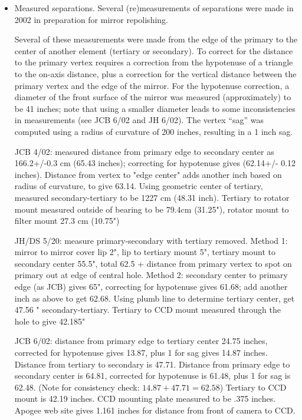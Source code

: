 \documentclass{article}[12pt]
\begin{document}
\begin{itemize}
\item Measured separations. Several (re)measurements of separations were
made in 2002 in preparation for mirror repolishing. 

Several of these measurements were made from the edge of the primary
to the center of another element (tertiary or secondary). To correct for
the distance to the primary vertex requires a correction from the hypotenuse
of a triangle to the on-axis distance, plus a correction for the vertical
distance between the primary vertex and the edge of the mirror. For
the hypotenuse correction, a diameter of the front surface of the mirror
was measured (approximately) to be 41 inches; note that using a smaller
diameter leads to some inconsistencies in measurements (see JCB 6/02 and
JH 6/02). The vertex ``sag'' was computed using a radius of curvature
of 200 inches, resulting in a 1 inch sag.

JCB 4/02: measured distance
from primary edge to secondary center as 166.2+/-0.3 cm (65.43 inches); 
correcting for hypotenuse gives (62.14+/- 0.12 inches). Distance from
vertex to "edge center" adds another inch based on radius of curvature,
to give 63.14. Using geometric center of tertiary, measured secondary-tertiary
to be 1227 cm (48.31 inch). Tertiary to rotator mount measured outside
of bearing to be 79.4cm (31.25"), rotator mount to filter mount 27.3 cm
(10.75")

JH/DS 5/20: measure primary-secondary with tertiary removed. Method 1:
mirror to mirror cover lip 2", lip to tertiary mount 5", tertiary mount
to secondary center 55.5", total 62.5 + distance from primary vertex to
spot on primary out at edge of central hole. Method 2: secondary center
to primary edge (as JCB) gives 65", correcting for hypotenuse gives 61.68;
add another inch as above to get 62.68. Using plumb line to determine tertiary
center, get 47.56 " secondary-tertiary. Tertiary to CCD mount measured
through the hole to give 42.185"

JCB 6/02: distance from primary edge to tertiary center 24.75 inches,
corrected for hypotenuse gives 13.87, plus 1 for sag gives 14.87 inches.
Distance from tertiary to secondary is 47.71. Distance from primary edge
to secondary center is 64.81, corrected for hypotenuse is 61.48, plus 1
for sag is 62.48. (Note for consistency check: $14.87+47.71=62.58$)
Tertiary to CCD mount is 42.19 inches. CCD mounting plate measured
to be .375 inches. Apogee web site gives 1.161 inches for distance from
front of camera to CCD.


\end{itemize}
\end{document}
